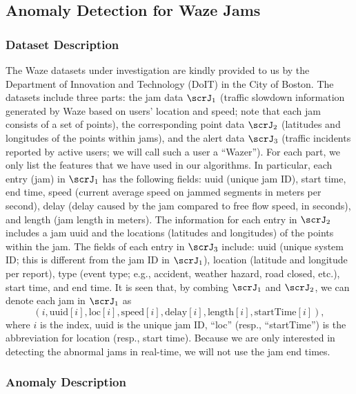 \documentclass[10pt, twocolumn]{IEEEtran}
\begin{document}
\subsection{Anomaly Detection for Waze Jams} \label{sec:anoWaze}


\subsubsection{Dataset Description}

The Waze datasets under investigation are kindly provided to us by the
Department of Innovation and Technology (DoIT) in the City of
Boston. The datasets include three parts: the jam data $\scrJ_1$
(traffic slowdown information generated by Waze based on users' location
and speed; note that each jam consists of a set of points), the
corresponding point data $\scrJ_2$ (latitudes and longitudes of the
points within jams), and the alert data $\scrJ_3$ (traffic incidents
reported by active users; we will call such a user a ``Wazer''). For
each part, we only list the features that we have used in our
algorithms. In particular, each entry (jam) in $\scrJ_1$ has the
following fields: uuid (unique jam ID), start time, end time, speed
(current average speed on jammed segments in meters per second), delay
(delay caused by the jam compared to free flow speed, in seconds), and
length (jam length in meters). The information for each entry in
$\scrJ_2$ includes a jam uuid and the locations (latitudes and
longitudes) of the points within the jam. The fields of each entry in
$\scrJ_3$ include: uuid (unique system ID; this is different from the
jam ID in $\scrJ_1$), location (latitude and longitude per report), type
(event type; e.g., accident, weather hazard, road closed, etc.), start
time, and end time. It is seen that, by combing $\scrJ_1$ and $\scrJ_2$,
we can denote each jam in $\scrJ_1$ as
\[ 
(i, \text{uuid}[i], \text{loc}[i], \text{speed}[i], \text{delay}[i],
\text{length}[i], \text{startTime}[i]),
\]
where $i$ is the index, uuid is the unique jam ID, ``loc'' (resp.,
``startTime'') is the abbreviation for location (resp., start
time). Because we are only interested in detecting the abnormal jams in
real-time, we will not use the jam end times.


\subsubsection{Anomaly Description}
\end{document}
